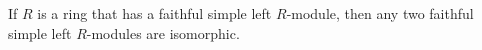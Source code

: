 If $R$ is a ring that has a faithful simple left $R$-module, then any two faithful simple left $R$-modules are isomorphic.
